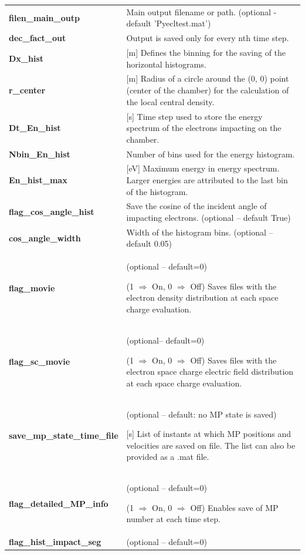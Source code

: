 \documentclass[a4paper,12pt]{article}
\begin{document}
\begin{longtable}{p{}p{}}
\hline\endfirsthead\hline\endhead\rowcolor{Gray}
\multicolumn{2}{p{.97\textwidth}}{
\textbf{Saving settings}
}\\ \hline
    \textbf{filen\_main\_outp} & Main output filename or path. (optional - default 'Pyecltest.mat') \\ \hline
    \textbf{dec\_fact\_out} & Output is saved only for every nth time step. \\ \hline
\textbf{Dx\_hist}& 	[m] Defines the binning for the saving of the horizontal histograms.\\ \hline
\textbf{r\_center}&	[m] Radius of a circle around the (0, 0) point (center of the chamber) for the calculation of the local central density.\\ \hline
\textbf{Dt\_En\_hist}&	[s] Time step used to store the energy spectrum  of the electrons impacting on the chamber.\\ \hline
\textbf{Nbin\_En\_hist}&	Number of bins used for the energy histogram.\\ \hline
\textbf{En\_hist\_max}& 	[eV] Maximum energy in energy spectrum. Larger energies are attributed to the last bin of the histogram.	\\ \hline
\textbf{flag\_cos\_angle\_hist} & Save the cosine of the incident angle of impacting electrons. (optional -- default True)
\\ \hline
\textbf{cos\_angle\_width} & Width of the histogram bins. (optional -- default 0.05)
\\ \hline
\textbf{flag\_movie}&	(optional -- default=0)

(1 $\Rightarrow$ On, 0 $\Rightarrow$ Off) Saves files with the electron density distribution at each space charge evaluation.\\ \hline
\textbf{flag\_sc\_movie}&	(optional-- default=0)

(1 $\Rightarrow$ On, 0 $\Rightarrow$ Off) Saves files with the electron space charge electric field distribution at each space charge evaluation.\\ \hline
\textbf{save\_mp\_state\_time\_file}&	(optional -- default: no MP state is saved)

[s] List of instants at which MP positions and velocities are saved on file. The list can also be provided as a .mat file.\\ \hline
\textbf{flag\_detailed\_MP\_info}&	(optional -- default=0)

(1 $\Rightarrow$ On, 0 $\Rightarrow$ Off) Enables save of MP number at each time step.\\ \hline
\textbf{flag\_hist\_impact\_seg}&	(optional -- default=0)


\end{longtable}
\end{document}
